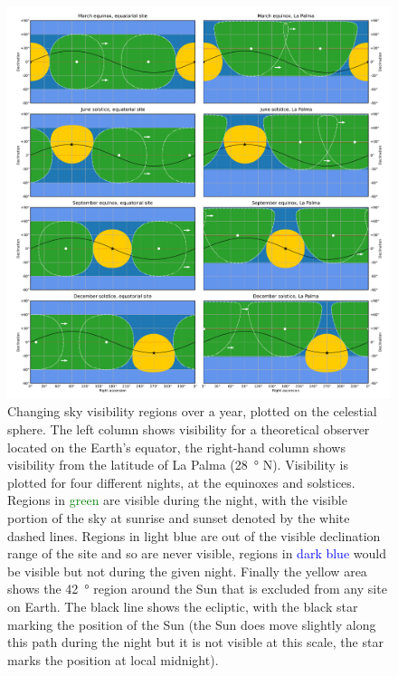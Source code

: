 \begin{colsection}
\begin{colsection}
\begin{figure}[p]
\begin{center}
\includegraphics[width=\linewidth]{images/visibility.pdf}
\end{center}

\caption[Plotting sky visibility regions over a year]{Changing sky visibility regions over a year, plotted on the celestial sphere. The left column shows visibility for a theoretical observer located on the Earth's equator, the right-hand column shows visibility from the latitude of La Palma (\SI{28}{\degree} N). Visibility is plotted for four different nights, at the equinoxes and solstices. Regions in \textcolor{Green}{green} are visible during the night, with the visible portion of the sky at sunrise and sunset denoted by the white dashed lines. Regions in \textcolor{NavyBlue}{light blue} are out of the visible declination range of the site and so are never visible, regions in \textcolor{Blue}{dark blue} would be visible but not during the given night. Finally the \textcolor{BurntOrange}{yellow} area shows the \SI{42}{\degree} region around the Sun that is excluded from any site on Earth. The black line shows the ecliptic, with the black star marking the position of the Sun (the Sun does move slightly along this path during the night but it is not visible at this scale, the star marks the position at local midnight).
}
\label{fig:visibility}
\end{figure}


\end{colsection}
\end{colsection}
